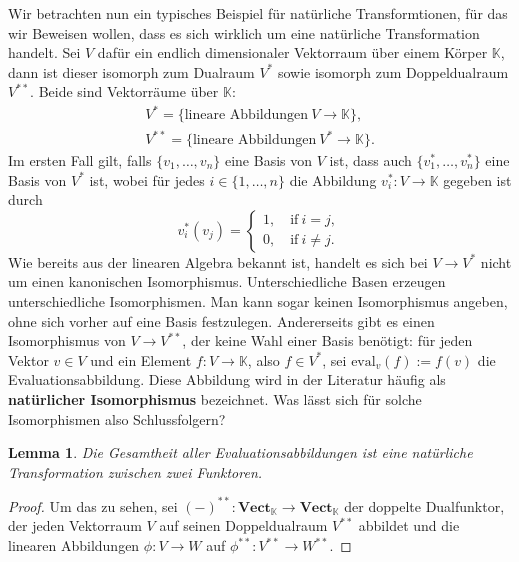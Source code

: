\documentclass{article}
\theoremstyle{plain}
\newtheorem{lem}[thm]{Lemma}
\theoremstyle{definition}
\theoremstyle{remark}
\begin{document}
Wir betrachten nun ein typisches Beispiel für natürliche Transformtionen, für das wir Beweisen wollen, dass es sich wirklich um eine natürliche Transformation handelt. Sei $V$ dafür ein endlich dimensionaler Vektorraum über einem Körper $\mathbb{K}$, dann ist dieser isomorph zum Dualraum $V^*$ sowie isomorph zum Doppeldualraum $V^{**}$. Beide sind Vektorräume über $\mathbb{K}$:
\begin{align}
	V^* = \{ \text{lineare Abbildungen} \ V \rightarrow \mathbb{K} \}, \\
	V^{**} = \{ \text{lineare Abbildungen} \ V^* \rightarrow \mathbb{K} \}.
\end{align}
Im ersten Fall gilt, falls $\{v_1, \ldots, v_n\}$ eine Basis von $V$ ist, dass auch $\{v_1^*, \ldots, v_n^*\}$ eine Basis von $V^*$ ist, wobei für jedes $i \in \{1, \ldots, n\}$ die Abbildung $v_i^*: V \rightarrow \mathbb{K}$ gegeben ist durch
\begin{equation}
	v_i^*(v_j) = \begin{cases}
	1, \quad \text{if} \ i = j, \\
	0, \quad \text{if} \ i \neq j.
	\end{cases}
\end{equation}
Wie bereits aus der linearen Algebra bekannt ist, handelt es sich bei $V \rightarrow V^*$ nicht um einen kanonischen Isomorphismus. Unterschiedliche Basen erzeugen unterschiedliche Isomorphismen. Man kann sogar keinen Isomorphismus angeben, ohne sich vorher auf eine Basis festzulegen. Andererseits gibt es einen Isomorphismus von $V \rightarrow V^{**}$, der keine Wahl einer Basis benötigt: für jeden Vektor $v \in V$ und ein Element $f: V \rightarrow \mathbb{K}$, also $f \in V^*$, sei $\text{eval}_v(f) := f(v)$ die Evaluationsabbildung. Diese Abbildung wird in der Literatur häufig als \textbf{natürlicher Isomorphismus} bezeichnet. Was lässt sich für solche Isomorphismen also Schlussfolgern?

\begin{lem}
Die Gesamtheit aller Evaluationsabbildungen ist eine natürliche Transformation zwischen zwei Funktoren.
\end{lem}

\begin{proof}
Um das zu sehen, sei $(-)^{**}: \textbf{Vect}_{\mathbb{K}} \rightarrow \textbf{Vect}_{\mathbb{K}}$ der doppelte Dualfunktor, der jeden Vektorraum $V$ auf seinen Doppeldualraum $V^{**}$ abbildet und die linearen Abbildungen $\phi: V \rightarrow W$ auf $\phi^{**}: V^{**} \rightarrow W^{**}$.
\end{proof}
\end{document}
